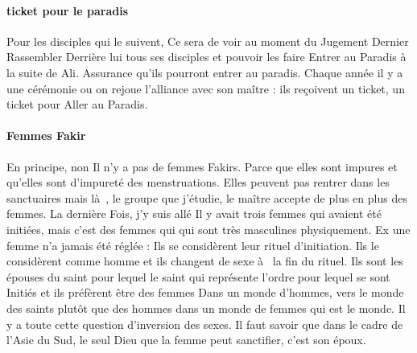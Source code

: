 \paragraph{ticket pour le paradis}  Pour les disciples qui  le suivent, 
Ce sera de voir au moment du Jugement 
Dernier 
Rassembler 
Derrière lui tous ses disciples et pouvoir les faire 
Entrer au 
Paradis à  la suite de Ali. Assurance qu'ils pourront 
entrer au paradis. Chaque année il y a une cérémonie ou on rejoue l'alliance avec son maître : ils reçoivent un ticket, un ticket pour 
Aller au 
Paradis. 

\paragraph{Femmes Fakir} En principe, non  Il n'y a pas de femmes Fakirs. Parce que elles sont impures et qu'elles sont 
d'impureté 
des menstruations.  Elles peuvent pas rentrer dans les sanctuaires mais là , le groupe que j'étudie, le maître accepte de plus en plus des femmes. La dernière 
Fois, j'y suis allé  Il y avait trois femmes qui  avaient été initiées, mais c'est des femmes qui  
qui  sont très 
masculines physiquement. Ex une femme n'a jamais été réglée : 
Ils se considèrent leur rituel 
d'initiation.  Ils le considèrent comme homme
   et ils changent 
de sexe   à  la fin du 
rituel. Ils sont les épouses 
du saint pour lequel le saint qui  représente l'ordre pour lequel se sont 
Initiés et ils préfèrent être des femmes 
Dans un monde d'hommes, vers le monde des saints plutôt que des hommes dans un monde de femmes qui  est le monde. 
Il y a toute cette question d'inversion des sexes. Il faut savoir que dans le cadre de 
l'Asie du 
Sud, le seul Dieu que la femme peut sanctifier, c'est son époux. 
 
